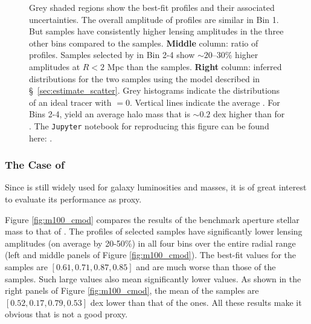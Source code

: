 \documentclass[fleqn,usenatbib,useAMS]{mnras}
\begin{document}
\begin{figure}
{        Grey shaded regions show the best-fit profiles and their associated uncertainties. 
        The overall amplitude of \dsigma{} profiles are similar in Bin 1.
        But  samples have consistently higher lensing amplitudes in the three other
        bins compared to the  samples. 
        \textbf{Middle} column: ratio of \dsigma{} profiles. 
        Samples selected by  in Bin 2-4 show $\sim 20$--30\% higher \dsigma{}
        amplitudes at $R<2$ Mpc than the  samples. 
        \textbf{Right} column: inferred \mvir{} distributions for the two samples using the model
        described in \S\ \ref{sec:estimate_scatter}. 
        Grey histograms indicate the \mvir{} distributions of an ideal tracer with 
        \scatterMhaloObsSym{}{}$=0$.
        Vertical lines indicate the average \mvir{}. 
        For Bins 2-4,  yield an average halo mass that is $\sim 0.2$ dex higher than
        for .
        The \texttt{Jupyter} notebook for reproducing this figure can be found here:
        \href{https://github.com/dr-guangtou/jianbing/blob/master/notebooks/figure/fig6.ipynb}{\faGithub}.
    }
    \label{fig:m100_mout}
\end{figure}

\subsubsection{The Case of \mcmodel{}}
    \label{sec:m100_cmodel}

    Since \cmodel{} is still widely used for galaxy luminosities and masses, it is of great
    interest to evaluate its performance as \mvir{} proxy. 
    
    Figure \ref{fig:m100_cmod} compares the \topn{} results of the benchmark aperture stellar mass
     to that of \mcmodel{}.  
    The \dsigma{} profiles of \mcmodel{} selected samples have significantly lower lensing
    amplitudes (on average by 20-50\%) in all four bins over the entire radial range (left and
    middle panels of Figure \ref{fig:m100_cmod}). 
    The best-fit \sigmvir{} values for the \mcmodel{} samples are $[0.61, 0.71, 0.87, 0.85]$ and are
    much worse than those of the  samples.
    Such large \sigmvir{} values also mean significantly lower \mvir{} values.
    As shown in the right panels of Figure \ref{fig:m100_cmod}, the mean \mvir{} of the \mcmodel{}
    \topn{} samples are $[0.52, 0.17, 0.79, 0.53]$ dex lower than that of the \maper{} ones.
    All these results make it  obvious that \cmodel{} is not a good \mvir{} proxy. 
\end{document}
